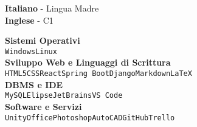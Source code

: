 \documentclass[9pt]{developercv} %
\begin{document}
\vspace{\baselineskip}
\begin{minipage}[t]{0.34\textwidth} %
	\vspace{-\baselineskip} %

	
	\textbf{Italiano} - Lingua Madre\\
	\textbf{Inglese} - C1
\end{minipage}
\hfill %
\begin{minipage}[t]{0.65\textwidth} %
	\vspace{-\baselineskip} %
	
	
	\textbf{Sistemi Operativi} \\
	\texttt{Windows}\slashsep\texttt{Linux}\\
	\textbf{Sviluppo Web e Linguaggi di Scrittura}\\
	\texttt{HTML5}\slashsep\texttt{CSS}\slashsep\texttt{React}\slashsep\texttt{Spring Boot}\slashsep\texttt{Django}\slashsep\texttt{Markdown}\slashsep\texttt{LaTeX}\\
	\textbf{DBMS e IDE}\\
	\texttt{MySQL}\slashsep\texttt{Elipse}\slashsep\texttt{JetBrains}\slashsep\texttt{VS Code}\\
	\textbf{Software e Servizi}\\
	\texttt{Unity}\slashsep\texttt{Office}\slashsep\texttt{Photoshop}\slashsep\texttt{AutoCAD}\slashsep\texttt{GitHub}\slashsep\texttt{Trello}
\end{minipage}



%
%	
%	
%	
%	
%	

\end{document}
